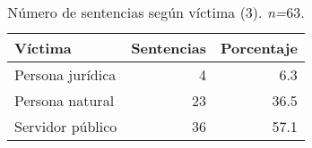 \begin{table}[!htbp]
\centering
\caption{Número de sentencias según víctima (3). \textit{n=}63.} 
\label{tab:victima}
\begin{tabular}{lrr}
  \hline
Víctima & Sentencias & Porcentaje \\ 
  \hline
Persona jurídica &  4 & 6.3 \\ 
  Persona natural & 23 & 36.5 \\ 
  Servidor público & 36 & 57.1 \\ 
   \hline
\end{tabular}
\end{table}
